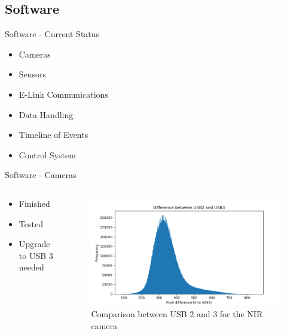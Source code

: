 \documentclass[11pt, aspectratio=169]{beamer}
\begin{document}
\subsection{Software}

\begin{frame}[c]{Software - Current Status}
    \begin{itemize}
        \item Cameras
        \item Sensors
        \item E-Link Communications
        \item Data Handling
        \item Timeline of Events
        \item Control System
    \end{itemize}
\end{frame}

\begin{frame}[c]{Software - Cameras}
    \begin{columns}[t]
        \begin{column}{.4\textwidth}
            \begin{itemize}
                \item Finished
                \item Tested
                \item Upgrade to USB 3 needed
            \end{itemize}
        \end{column}
        
        \begin{column}{.6\textwidth}
            \begin{figure}[H]
                \includegraphics[width=\textwidth]{software/usb_comp.png}
                \caption{Comparison between USB 2 and 3 for the NIR camera}
            \end{figure}
        \end{column}
    \end{columns}
\end{frame}
\end{document}
